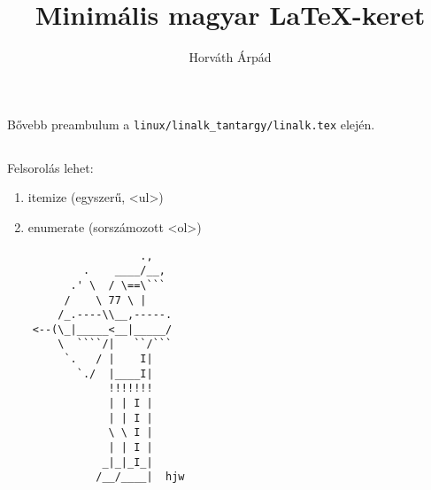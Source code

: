 \documentclass[a4paper]{article}
\begin{document}
\title{Minimális magyar \LaTeX-keret}
\author{Horváth Árpád}
\maketitle

\section{}

Bővebb preambulum a \verb!linux/linalk_tantargy/linalk.tex! elején.

\subsection{}

\subsubsection{}

Felsorolás lehet:
\begin{enumerate}
\item  itemize (egyszerű, <ul>)
\item  enumerate (sorszámozott <ol>)
\end{enumerate}

\begin{verbatim}
                     .,
            .    ____/__,
          .' \  / \==\```
         /    \ 77 \ |
        /_.----\\__,-----.
    <--(\_|_____<__|_____/
        \  ````/|   ``/```
         `.   / |    I|
           `./  |____I|
                !!!!!!!
                | | I |
                | | I |
                \ \ I |
                | | I |
               _|_|_I_|
              /__/____|  hjw
\end{verbatim}

\tableofcontents
\end{document}
